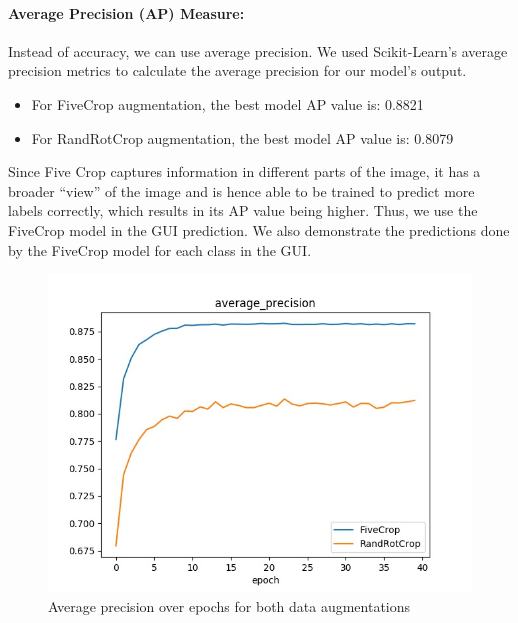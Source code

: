 \documentclass{article}
\begin{document}
\paragraph{Average Precision (AP) Measure:} Instead of accuracy, we can use average precision. We used Scikit-Learn's average precision metrics to calculate the average precision for our model's output.
\begin{itemize}
    \item For FiveCrop augmentation, the best model AP value is: 0.8821
    \item For RandRotCrop augmentation, the best model AP value is: 0.8079
\end{itemize}

Since Five Crop captures information in different parts of the image, it has a broader ``view'' of the image and is hence able to be trained to predict more labels correctly, which results in its AP value being higher. Thus, we use the FiveCrop model in the GUI prediction. We also demonstrate the predictions done by the FiveCrop model for each class in the GUI.
\begin{figure}[H]
    \centering
    \includegraphics[width=.7\textwidth]{average_precision.jpg}
    \caption{Average precision over epochs for both data augmentations}
    \label{fig:avg_precision}
\end{figure}
\end{document}
